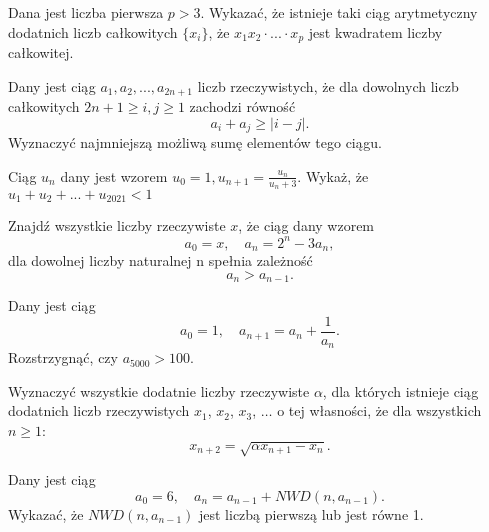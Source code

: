 \begin{problem}{1}
	Dana jest liczba pierwsza $p>3$. Wykazać, że istnieje taki ciąg arytmetyczny dodatnich liczb całkowitych $\{x_i\}$, że $x_1x_2\cdot ... \cdot x_p$ jest kwadratem liczby całkowitej.
\end{problem}


\begin{problem}{2}
	Dany jest ciąg $a_1, a_2, ..., a_{2n + 1}$ liczb rzeczywistych, że dla dowolnych liczb całkowitych ${2n + 1 \geqslant i, j \geqslant 1}$ zachodzi równość
	\[
		a_i + a_j \geqslant |i - j|.
	\]
	Wyznaczyć najmniejszą możliwą sumę elementów tego ciągu.
\end{problem}

\begin{problem}{3}
	Ciąg ${u_n}$ dany jest wzorem $u_0=1, u_{n+1}=\frac{u_n}{u_n+3}$. Wykaż, że $ u_1+u_2+...+u_{2021}<1$
\end{problem}


\begin{problem}{4}
	Znajdź wszystkie liczby rzeczywiste $x$, że ciąg dany wzorem
	\[
		a_0 = x, \quad a_n = 2^n - 3a_n,
	\]
	dla dowolnej liczby naturalnej n spełnia zależność
	\[
		a_{n} > a_{n - 1}.
	\]
\end{problem}


\begin{problem}{5}
	Dany jest ciąg
	\[
		a_0 = 1, \quad a_{n + 1} = a_n + \frac{1}{a_n}.
	\]
	Rozstrzygnąć, czy $a_{5000} > 100$.
\end{problem}

\begin{problem}{6}
	Wyznaczyć wszystkie dodatnie liczby rzeczywiste $\alpha$, dla których istnieje ciąg dodatnich liczb rzeczywistych $x_1$, $x_2$, $x_3$, $\dots$ o tej własności, że dla wszystkich $n\geqslant 1$:
	\[
		x_{n+2} = \sqrt{\alpha x_{n+1} - x_n}.
	\]
\end{problem}

\begin{problem}{7}
	Dany jest ciąg
	\[
		a_0 = 6, \quad a_n = a_{n - 1} + NWD(n, a_{n - 1}).
	\]
	Wykazać, że $NWD(n, a_{n - 1})$ jest liczbą pierwszą lub jest równe 1.
\end{problem}


